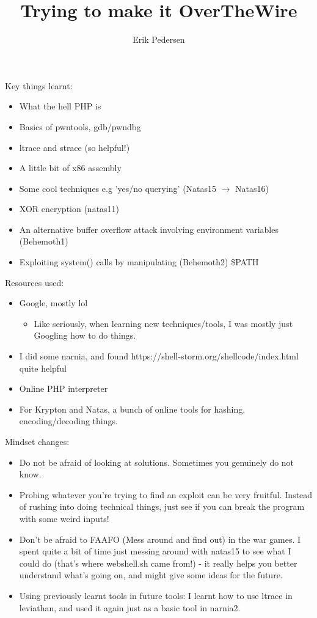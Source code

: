 \documentclass{article}
\title{Trying to make it OverTheWire}
\author{Erik Pedersen}
\begin{document}
\maketitle

Key things learnt:
\begin{itemize}
	\item What the hell PHP is
	\item Basics of pwntools, gdb/pwndbg
	\item ltrace and strace (so helpful!)
	\item A little bit of x86 assembly
	\item Some cool techniques e.g 'yes/no querying' (Natas15 $\to$ Natas16)
	\item XOR encryption (natas11)
	\item An alternative buffer overflow attack involving environment variables (Behemoth1)
	\item Exploiting system() calls by manipulating (Behemoth2) \$PATH
\end{itemize}

Resources used:

\begin{itemize}
	\item Google, mostly lol
		\begin{itemize}
			\item Like seriously, when learning new techniques/tools, I was mostly just Googling how to do things.
		\end{itemize}
	\item I did some narnia, and found https://shell-storm.org/shellcode/index.html quite helpful
	\item Online PHP interpreter
	\item For Krypton and Natas, a bunch of online tools for hashing, encoding/decoding things.

\end{itemize}

Mindset changes:

\begin{itemize}

	\item Do not be afraid of looking at solutions. Sometimes you genuinely do not know.
	\item Probing whatever you're trying to find an exploit can be very fruitful. Instead of rushing into doing technical things, just see if you can break the program with some weird inputs!
	\item Don't be afraid to FAAFO (Mess around and find out) in the war games. I spent quite a bit of time just messing around with natas15 to see what I could do (that's where webshell.sh came from!) - it really helps you better understand what's going on, and might give some ideas for the future.
	\item Using previously learnt tools in future tools: I learnt how to use ltrace in leviathan, and used it again just as a basic tool in narnia2.

\end{itemize}
\end{document}
